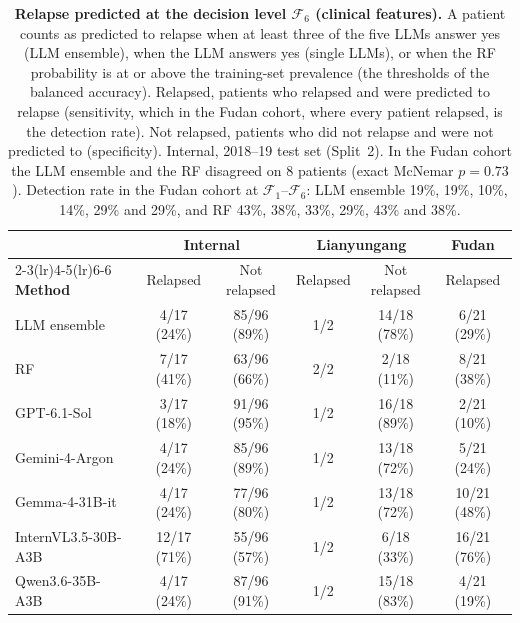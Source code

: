 \documentclass[pdflatex,sn-nature]{sn-jnl}
\begin{document}
\begin{appendices}
\begin{table}[ht]
\caption{\textbf{Relapse predicted at the decision level
$\mathcal{F}_6$ (clinical features).} A patient counts as predicted
to relapse when at least three of the five LLMs answer yes (LLM
ensemble), when the LLM answers yes (single LLMs), or when the RF
probability is at or above the training-set prevalence (the thresholds
of the balanced accuracy). Relapsed, patients who relapsed and were
predicted to relapse (sensitivity, which in the Fudan cohort, where
every patient relapsed, is the detection rate). Not relapsed, patients
who did not relapse and were not predicted to (specificity). Internal,
2018--19 test set (Split~2). In the Fudan cohort the LLM ensemble and
the RF disagreed on 8 patients (exact McNemar $p=0.73$). Detection
rate in the Fudan cohort at $\mathcal{F}_1$--$\mathcal{F}_6$: LLM
ensemble 19\%, 19\%, 10\%, 14\%, 29\% and 29\%, and RF 43\%, 38\%,
33\%, 29\%, 43\% and 38\%.}
\label{tab:relapse_detection}
\centering
\footnotesize
\setlength{\tabcolsep}{4pt}
\begin{tabular}{@{}lccccc@{}}
\toprule
 & \multicolumn{2}{c}{\textbf{Internal}} & \multicolumn{2}{c}{\textbf{Lianyungang}} & \textbf{Fudan} \\
\cmidrule(lr){2-3}\cmidrule(lr){4-5}\cmidrule(lr){6-6}
\textbf{Method} & Relapsed & Not relapsed & Relapsed & Not relapsed & Relapsed \\
\midrule
LLM ensemble & 4/17 (24\%) & 85/96 (89\%) & 1/2 & 14/18 (78\%) & 6/21 (29\%) \\
RF & 7/17 (41\%) & 63/96 (66\%) & 2/2 & 2/18 (11\%) & 8/21 (38\%) \\
\addlinespace[2pt]
GPT-6.1-Sol & 3/17 (18\%) & 91/96 (95\%) & 1/2 & 16/18 (89\%) & 2/21 (10\%) \\
Gemini-4-Argon & 4/17 (24\%) & 85/96 (89\%) & 1/2 & 13/18 (72\%) & 5/21 (24\%) \\
Gemma-4-31B-it & 4/17 (24\%) & 77/96 (80\%) & 1/2 & 13/18 (72\%) & 10/21 (48\%) \\
InternVL3.5-30B-A3B & 12/17 (71\%) & 55/96 (57\%) & 1/2 & 6/18 (33\%) & 16/21 (76\%) \\
Qwen3.6-35B-A3B & 4/17 (24\%) & 87/96 (91\%) & 1/2 & 15/18 (83\%) & 4/21 (19\%) \\
\bottomrule
\end{tabular}
\end{table}


\clearpage


\end{appendices}
\end{document}
